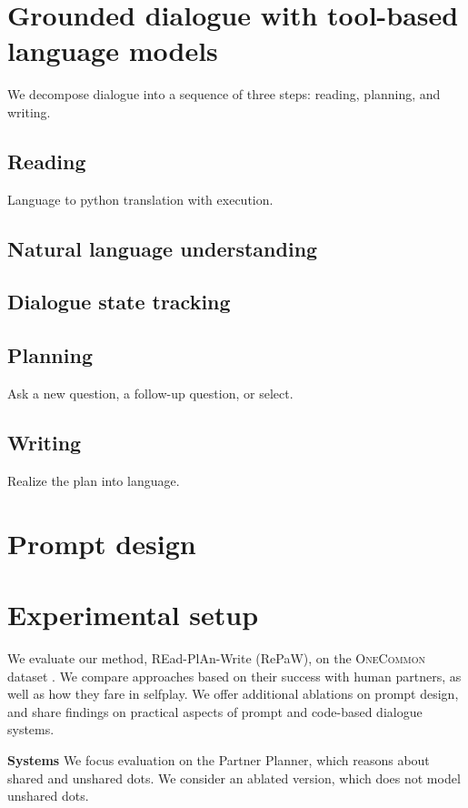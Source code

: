 \documentclass[11pt]{article}
\begin{document}
\section{Grounded dialogue with tool-based language models}
We decompose dialogue into a sequence of three steps: reading, planning, and writing.

\subsection{Reading}
Language to python translation with execution.
\subsection{Natural language understanding}
\subsection{Dialogue state tracking}

\subsection{Planning}
Ask a new question, a follow-up question, or select.

\subsection{Writing}
Realize the plan into language.

\section{Prompt design}

\section{Experimental setup}
\label{sec:exp}
We evaluate our method, REad-PlAn-Write (RePaW),
on the \textsc{OneCommon} dataset \citep{onecommon}.
We compare approaches based on their success with human partners,
as well as how they fare in selfplay.
We offer additional ablations on prompt design,
and share findings on practical aspects of prompt and code-based
dialogue systems.


\textbf{Systems}
We focus evaluation on the Partner Planner,
which reasons about shared and unshared dots.
We consider an ablated version, which does not model unshared dots.
\end{document}
